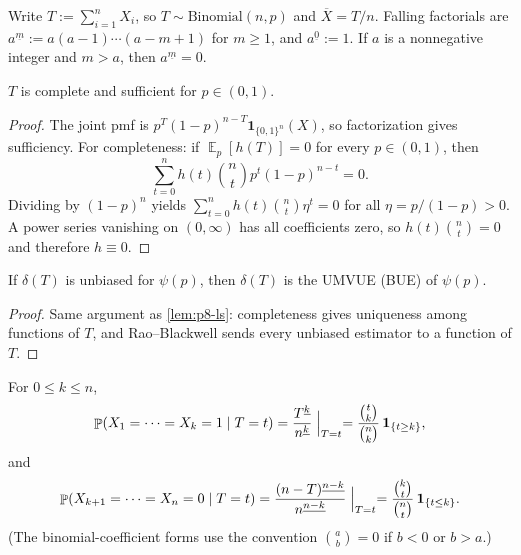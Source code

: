 \documentclass[11pt,a4paper]{article}
\DeclareMathOperator{\E}{\mathbb{E}}
\DeclareMathOperator{\Pbb}{\mathbb{P}}
\begin{document}
Write \(T:=\sum_{i=1}^n X_i\), so \(T\sim\mathrm{Binomial}(n,p)\) and \(\overline{X}=T/n\). Falling factorials are \(a^{\underline{m}}:=a(a-1)\cdots(a-m+1)\) for \(m\ge 1\), and \(a^{\underline{0}}:=1\). If \(a\) is a nonnegative integer and \(m>a\), then \(a^{\underline{m}}=0\).

\begin{lemma}
\label{lem:p9-complete}
\(T\) is complete and sufficient for \(p\in(0,1)\).
\end{lemma}

\begin{proof}
The joint pmf is \(p^{T}(1-p)^{n-T}\mathbf{1}_{\{0,1\}^n}(X)\), so factorization gives sufficiency. For completeness: if \(\E_p[h(T)]=0\) for every \(p\in(0,1)\), then
\[
\sum_{t=0}^n h(t)\binom{n}{t}p^t(1-p)^{n-t}
=
0.
\]
Dividing by \((1-p)^n\) yields \(\sum_{t=0}^n h(t)\binom{n}{t}\eta^t=0\) for all \(\eta=p/(1-p)>0\). A power series vanishing on \((0,\infty)\) has all coefficients zero, so \(h(t)\binom{n}{t}=0\) and therefore \(h\equiv 0\).
\end{proof}

\begin{lemma}
\label{lem:p9-ls}
If \(\delta(T)\) is unbiased for \(\psi(p)\), then \(\delta(T)\) is the UMVUE (BUE) of \(\psi(p)\).
\end{lemma}

\begin{proof}
Same argument as \cref{lem:p8-ls}: completeness gives uniqueness among functions of \(T\), and Rao--Blackwell sends every unbiased estimator to a function of \(T\).
\end{proof}

\begin{lemma}
\label{lem:p9-hyper}
For \(0\le k\le n\),
\[
\Pbb(X_1=\cdots=X_k=1\mid T=t)
=
\frac{T^{\underline{k}}}{n^{\underline{k}}}
\Bigm|_{T=t}
=
\frac{\binom{t}{k}}{\binom{n}{k}}\,\mathbf{1}_{\{t\ge k\}},
\]
and
\[
\Pbb(X_{k+1}=\cdots=X_n=0\mid T=t)
=
\frac{(n-T)^{\underline{n-k}}}{n^{\underline{n-k}}}
\Bigm|_{T=t}
=
\frac{\binom{k}{t}}{\binom{n}{t}}\,\mathbf{1}_{\{t\le k\}}.
\]
(The binomial-coefficient forms use the convention \(\binom{a}{b}=0\) if \(b<0\) or \(b>a\).)
\end{lemma}
\end{document}
